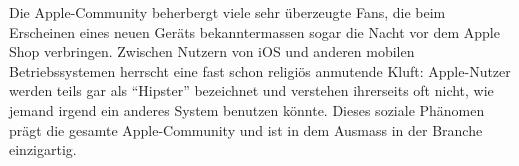 Die \mbox{Apple-Community} beherbergt viele sehr überzeugte Fans, die beim Erscheinen eines neuen Geräts bekanntermassen sogar die Nacht vor dem Apple Shop verbringen. Zwischen Nutzern von iOS und anderen mobilen Betriebssystemen herrscht eine fast schon religiös anmutende Kluft: \mbox{Apple-Nutzer} werden teils gar als ``Hipster''\thinspace\cite{online:ios-hipster} bezeichnet und verstehen ihrerseits oft nicht, wie jemand irgend ein anderes System benutzen könnte. Dieses soziale Phänomen prägt die gesamte Apple-Community und ist in dem Ausmass in der Branche einzigartig.